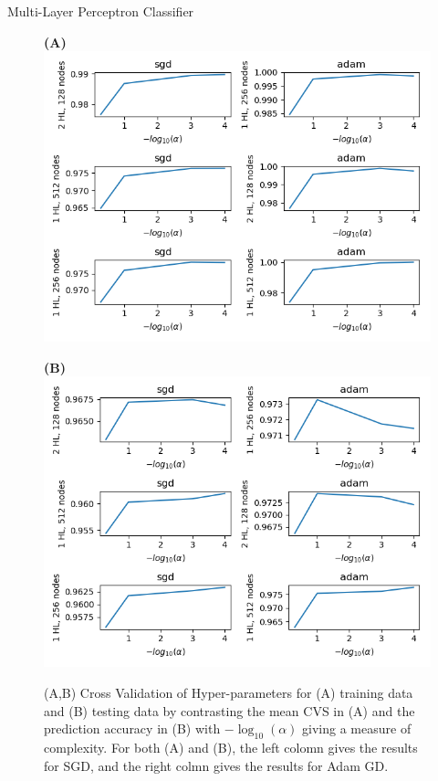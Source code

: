 \documentclass[titlepage,leqno]{beamer}%
\begin{document}
\begin{frame}{Multi-Layer Perceptron Classifier}

\begin{figure}[h]
    \centering
    \begin{minipage}[t]{0.45\textwidth}
        \centering
        \textbf{(A)}
        \includegraphics[width=\textwidth]{TrainscoreVsAlpha.png}
    \end{minipage}
    \begin{minipage}[t]{0.45\textwidth}
        \centering
        \textbf{(B)}
        \includegraphics[width=\textwidth]{CVscoreVsAlpha.png}
    \end{minipage}
\caption{\scriptsize
(A,B) Cross Validation of Hyper-parameters for (A) training data and (B) testing data by contrasting the mean CVS in (A) and the prediction accuracy in (B) with $-\log_{10}(\alpha)$ giving a measure of complexity. For both (A) and (B), the left colomn gives the results for SGD, and the right colmn gives the results for Adam GD.}
\end{figure}

\end{frame}
\end{document}
